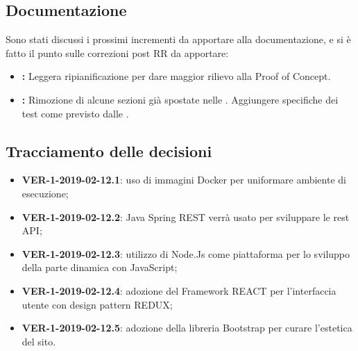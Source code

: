 \documentclass[a4paper, oneside, openany, dvipsnames, table]{article}
\begin{document}
\subsection{Documentazione}
Sono stati discussi i prossimi incrementi da apportare alla documentazione, e si è fatto il punto sulle correzioni post RR da apportare:
\begin{itemize}
	\item \textbf{\PdP: }Leggera ripianificazione per dare maggior rilievo alla Proof of Concept.
	\item \textbf{\PdQ: }Rimozione di alcune sezioni già spostate nelle \NdP. Aggiungere specifiche dei test come previsto dalle \NdP .
\end{itemize}

\subsection{Tracciamento delle decisioni}

\begin{itemize}
	\item \textbf{VER-1-2019-02-12.1}: uso di immagini Docker per uniformare ambiente di esecuzione;
	\item \textbf{VER-1-2019-02-12.2}: Java Spring REST verrà usato per sviluppare le rest API;
	\item \textbf{VER-1-2019-02-12.3}: utilizzo di Node.Js come piattaforma per lo sviluppo della parte dinamica con JavaScript;
	\item \textbf{VER-1-2019-02-12.4}: adozione del Framework REACT per l'interfaccia utente con design pattern REDUX;
	\item \textbf{VER-1-2019-02-12.5}: adozione della libreria Bootstrap per curare l'estetica del sito.
\end{itemize}
\end{document}
